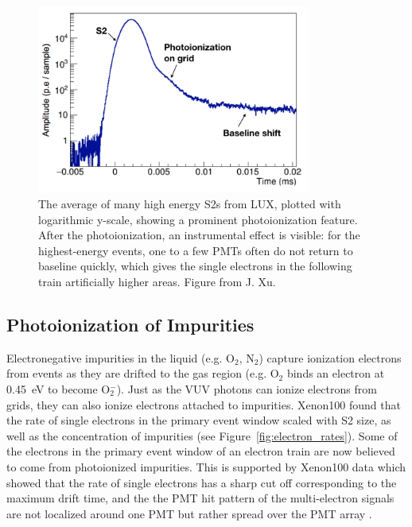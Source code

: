 \begin{figure}[htbp]
\begin{center}
\includegraphics[width=0.8\textwidth]{figures/etrains/s2_averages.png}
\caption{The average of many high energy S2s from \acs{LUX}, plotted with logarithmic y-scale, showing a prominent photoionization feature. After the photoionization, an instrumental effect is visible: for the highest-energy events, one to a few \acs{PMT}s often do not return to baseline quickly, which gives the single electrons in the following train artificially higher areas. Figure from J. Xu. }
\label{fig:s2_averages}
\end{center}
\end{figure}


\subsection{Photoionization of Impurities} 
\label{sec:photoionization_impurities}
Electronegative impurities in the liquid (e.g. O$_{2}$, N$_{2}$) capture ionization electrons from events as they are drifted to the gas region (e.g. O$_{2}$ binds an electron at 0.45~eV to become O$^{-}_{2}$). Just as the \ac{VUV} photons can ionize electrons from grids, they can also ionize electrons attached to impurities. Xenon100 found that the rate of single electrons in the primary event window scaled with S2 size, as well as the concentration of impurities \cite{Aprile2014} (see Figure~\ref{fig:electron_rates}). Some of the electrons in the primary event window of an electron train are now believed to come from photoionized impurities. This is supported by Xenon100 data which showed that the rate of single electrons has a sharp cut off corresponding to the maximum drift time, and the the PMT hit pattern of the multi-electron signals are not localized around one PMT but rather spread over the PMT array \cite{Aprile2014}. 

